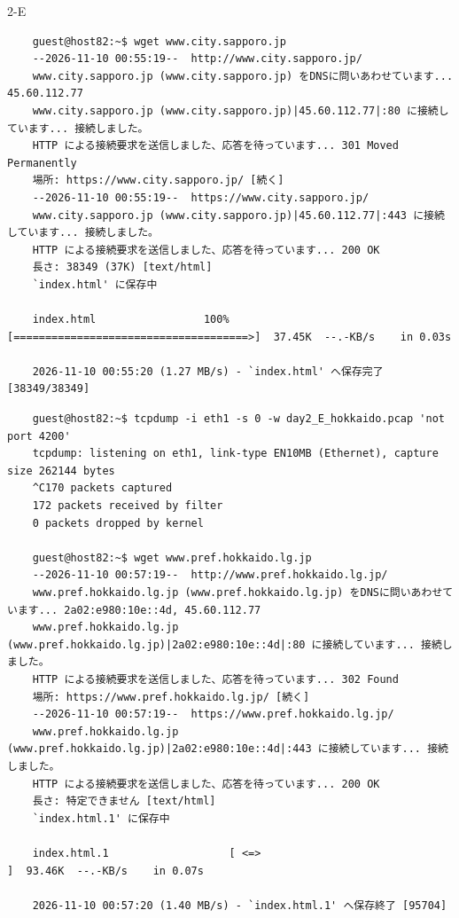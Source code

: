 \begin{maintask}{2-E}
\begin{termout}[H]
\begin{verbatim}
    guest@host82:~$ wget www.city.sapporo.jp
    --2026-11-10 00:55:19--  http://www.city.sapporo.jp/
    www.city.sapporo.jp (www.city.sapporo.jp) をDNSに問いあわせています... 45.60.112.77
    www.city.sapporo.jp (www.city.sapporo.jp)|45.60.112.77|:80 に接続しています... 接続しました。
    HTTP による接続要求を送信しました、応答を待っています... 301 Moved Permanently
    場所: https://www.city.sapporo.jp/ [続く]
    --2026-11-10 00:55:19--  https://www.city.sapporo.jp/
    www.city.sapporo.jp (www.city.sapporo.jp)|45.60.112.77|:443 に接続しています... 接続しました。
    HTTP による接続要求を送信しました、応答を待っています... 200 OK
    長さ: 38349 (37K) [text/html]
    `index.html' に保存中

    index.html                 100%[=====================================>]  37.45K  --.-KB/s    in 0.03s   

    2026-11-10 00:55:20 (1.27 MB/s) - `index.html' へ保存完了 [38349/38349]
    \end{verbatim}
  \end{termout}

  \begin{termout}[H]
    \caption{www.pref.hokkaido.lg.jp の tcpdump と wget の実行結果}\label{out:e_hokkaido}
    \begin{verbatim}
    guest@host82:~$ tcpdump -i eth1 -s 0 -w day2_E_hokkaido.pcap 'not port 4200'
    tcpdump: listening on eth1, link-type EN10MB (Ethernet), capture size 262144 bytes
    ^C170 packets captured
    172 packets received by filter
    0 packets dropped by kernel

    guest@host82:~$ wget www.pref.hokkaido.lg.jp
    --2026-11-10 00:57:19--  http://www.pref.hokkaido.lg.jp/
    www.pref.hokkaido.lg.jp (www.pref.hokkaido.lg.jp) をDNSに問いあわせています... 2a02:e980:10e::4d, 45.60.112.77
    www.pref.hokkaido.lg.jp (www.pref.hokkaido.lg.jp)|2a02:e980:10e::4d|:80 に接続しています... 接続しました。
    HTTP による接続要求を送信しました、応答を待っています... 302 Found
    場所: https://www.pref.hokkaido.lg.jp/ [続く]
    --2026-11-10 00:57:19--  https://www.pref.hokkaido.lg.jp/
    www.pref.hokkaido.lg.jp (www.pref.hokkaido.lg.jp)|2a02:e980:10e::4d|:443 に接続しています... 接続しました。
    HTTP による接続要求を送信しました、応答を待っています... 200 OK
    長さ: 特定できません [text/html]
    `index.html.1' に保存中

    index.html.1                   [ <=>                                  ]  93.46K  --.-KB/s    in 0.07s   

    2026-11-10 00:57:20 (1.40 MB/s) - `index.html.1' へ保存終了 [95704]
    \end{verbatim}
  \end{termout}


\end{maintask}
